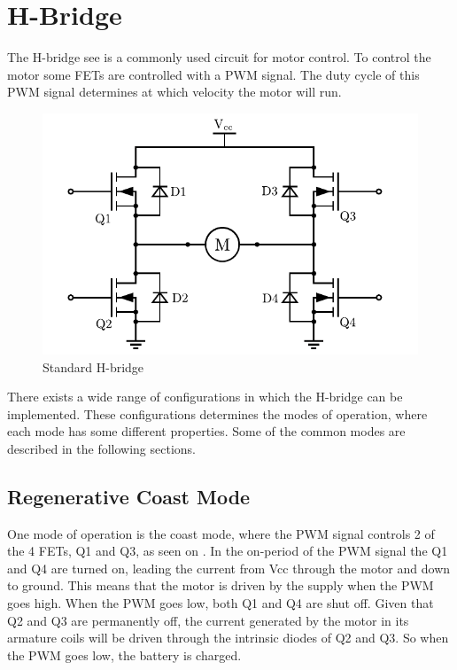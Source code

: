 \section{H-Bridge}
The H-bridge see  is a commonly used circuit for motor control. To control the motor some FETs are controlled with a PWM signal. The duty cycle of this PWM signal determines at which velocity the motor will run.

\begin{figure}[H]
	\centering
	\includegraphics[scale=.6]{figures/Hbridge.pdf}
	\caption{Standard H-bridge}
	\label{Hbridge}
\end{figure}

There exists a wide range of configurations in which the H-bridge can be implemented. These configurations determines the modes of operation, where each mode has some different properties. Some of the common modes are described in the following sections.

\subsection{Regenerative Coast Mode}
One mode of operation is the coast mode, where the PWM signal controls 2 of the 4 FETs, Q1 and Q3, as seen on . In the on-period of the PWM signal the Q1 and Q4 are turned on, leading the current from Vcc through the motor and down to ground. This means that the motor is driven by the supply when the PWM goes high. When the PWM goes low, both Q1 and Q4 are shut off. Given that Q2 and Q3 are permanently off, the current generated by the motor in its armature coils will be driven through the intrinsic diodes of Q2 and Q3. So when the PWM goes low, the battery is charged.

